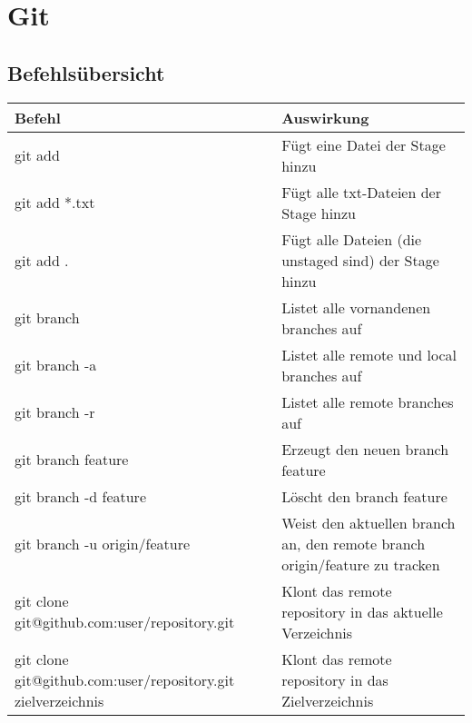\section{Git}

	\subsection{Befehlsübersicht}

		\renewcommand{\arraystretch}{1.5}
		\begin{longtable}{|p{7cm}|p{8cm}|}
		  
		  	\hline

		  	\rowcolor{tableheadcolor}
		  	\textbf{Befehl} & \textbf{Auswirkung}

		  	\\ \hline

		  	\rowcolor{tablerowcolor_cyan}
		  	git add & Fügt eine Datei der Stage hinzu
		  	\\ \hline
		  	\rowcolor{tablerowcolor_cyan}
		  	git add *.txt & Fügt alle txt-Dateien der Stage hinzu
		  	\\ \hline
		  	\rowcolor{tablerowcolor_cyan}
		  	git add . & Fügt alle Dateien (die unstaged sind) der Stage hinzu
		  	\\ \hline

		  	\rowcolor{tablerowcolor_orange}
		  	git branch & Listet alle vornandenen branches auf
		  	\\ \hline
		  	\rowcolor{tablerowcolor_orange}
		  	git branch -a & Listet alle remote und local branches auf
		  	\\ \hline
		  	\rowcolor{tablerowcolor_orange}
		  	git branch -r & Listet alle remote branches auf
		  	\\ \hline
		  	\rowcolor{tablerowcolor_orange}
		  	git branch feature & Erzeugt den neuen branch feature
		  	\\ \hline
		  	\rowcolor{tablerowcolor_orange}
		  	git branch -d feature & Löscht den branch feature
		  	\\ \hline
		  	\rowcolor{tablerowcolor_orange}
		  	git branch -u origin/feature & Weist den aktuellen branch an, den remote branch origin/feature zu tracken
		  	\\ \hline


		  	\rowcolor{tablerowcolor_cyan}
		  	git clone git@github.com:user/repository.git & Klont das remote repository in das aktuelle Verzeichnis
		  	\\ \hline
		  	\rowcolor{tablerowcolor_cyan}
		  	git clone git@github.com:user/repository.git zielverzeichnis & Klont das remote repository in das Zielverzeichnis
		  	\\ \hline



\end{longtable}
